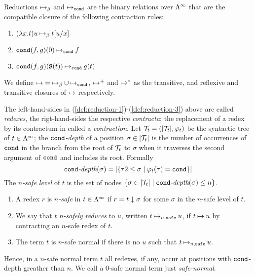 \begin{definition}\label{def:reduction}
Reductions $\mathbin{\mapsto}_\beta$ and $\mathbin{\mapsto}_{\tt cond}$ are the binary relations over $\Lambda^\infty$ that are the compatible closure of 
the following contraction rules:

\begin{enumerate}
\item \label{def:reduction-1} $(\lambda x.t)u \mathbin{\mapsto}_\beta t[u/x]$
\item \label{def:reduction-2} ${\tt cond}(f,g)(0) \mathbin{\mapsto}_{\tt cond} f$
\item \label{def:reduction-3} ${\tt cond}(f,g)({\tt S} (t)) \mathbin{\mapsto}_{\tt cond} g(t)$
\end{enumerate}
We define $\mathbin{\mapsto} = \mathbin{\mapsto}_\beta \cup \mathbin{\mapsto}_{\tt cond}$, $\mathbin{\mapsto}^+$ and $\mathbin{\mapsto}^*$ as the transitive, and reflexive and transitive
closures of $\mathbin{\mapsto}$ respectively.
\end{definition}

The left-hand-sides in (\ref{def:reduction-1})-(\ref{def:reduction-3}) above are called {\em redexes}, the rigt-hand-sides the respective {\em contracta};
the replacement of a redex by its contractum in called a {\em contraction}.
Let ${\cal T}_t = (|{\cal T}_t|, \varphi_t)$ be the syntactic tree of $t\in \Lambda^\infty$;
the {\em ${\tt cond}$-depth} of a position $\sigma \in |{\cal T}_t|$ is the number of occurrences of ${\tt cond}$ 
in the branch from the root of ${\cal T}_t$ to $\sigma$ when it traverses the second argument of ${\tt cond}$ and includes its root.
Formally
\[\textit{${\tt cond}$-depth}(\sigma) = |\{ \tau 2 \leq \sigma \mid \varphi_t(\tau) = {\tt cond} \}|\]
The {\em $n$-safe level} of $t$ is the set of nodes $\{ \sigma \in |{\cal T}_t| \mid \textit{${\tt cond}$-depth}(\sigma) \leq n \}$.

\begin{definition}\label{def:n-safe}
\hfill
\begin{enumerate}
\item A redex $r$ is {\em $n$-safe} in $t \in \Lambda^\infty$ if $r = t \downarrow \sigma$ for some $\sigma$ in the $n$-safe level of $t$.

\item We say that $t$ {\em $n$-safely reduces} to $u$, written $t \mathbin{\mathbin{\mapsto}_{n,{\hbox{\scriptsize \tt safe}}}} u$, if $t \mathbin{\mapsto} u$ by contracting an $n$-safe
redex of $t$.

\item The term $t$ is $n$-safe normal if there is no $u$ such that $t \mathbin{\mathbin{\mapsto}_{n,{\hbox{\scriptsize \tt safe}}}} u$.
\end{enumerate}
\end{definition}

Hence, in a $n$-safe normal term $t$ all redexes, if any, occur at positions with ${\tt cond}$-depth greather than $n$. We call
a $0$-safe normal term just {\em safe-normal}.

